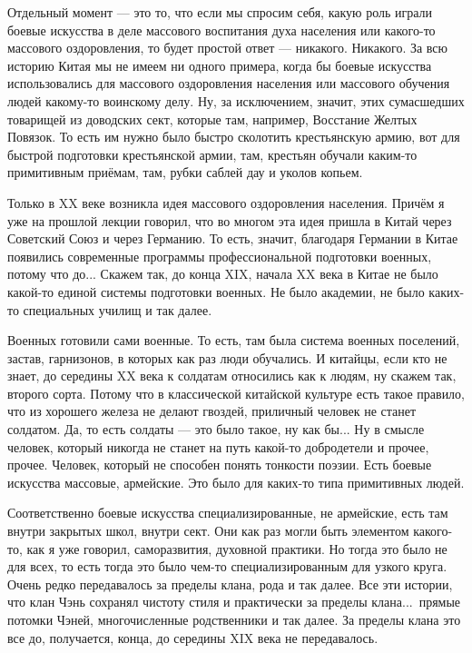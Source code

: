 Отдельный момент 
--- это то,  что если мы спросим себя, какую роль играли боевые 
искусства в деле массового воспитания духа населения 
или какого-то массового оздоровления, то будет 
простой ответ --- никакого. Никакого. За всю историю Китая 
мы не имеем ни одного примера, когда бы боевые 
искусства использовались для массового оздоровления 
населения или массового обучения людей какому-то 
воинскому делу. Ну, за исключением, значит, этих 
сумасшедших товарищей из доводских сект, которые там, 
например, Восстание Желтых Повязок. То есть им нужно 
было быстро сколотить крестьянскую армию, вот для 
быстрой подготовки крестьянской армии, там, крестьян 
обучали каким-то примитивным приёмам, там, рубки 
саблей дау и уколов копьем.
 
Только в XX веке возникла идея 
массового оздоровления населения. Причём я уже на 
прошлой лекции говорил, что во многом эта идея пришла 
в Китай через Советский Союз и через Германию. То есть, 
значит,  благодаря Германии в Китае появились 
современные программы профессиональной подготовки 
военных, потому что до...  Скажем так,  до конца XIX, 
начала XX века в Китае не было какой-то единой системы 
подготовки военных.  Не было академии, не было каких-то 
специальных училищ и так далее.

Военных готовили 
сами военные. То есть, там была система военных 
поселений,  застав, гарнизонов, в которых как раз люди 
обучались. И китайцы, если кто не знает,  до 
середины XX века к солдатам относились как к людям, ну 
скажем так, второго сорта.
Потому что в 
классической китайской культуре есть такое правило, 
что из хорошего железа не делают гвоздей,  приличный 
человек не станет солдатом.  Да, то есть солдаты --- это 
было такое, ну как бы...  Ну в смысле человек, который 
никогда не станет на путь какой-то добродетели и 
прочее, прочее. Человек,  который не способен понять 
тонкости поэзии. Есть боевые искусства массовые, 
армейские.  Это было для каких-то типа примитивных 
людей.

Соответственно боевые искусства 
специализированные,  не армейские, есть там внутри 
закрытых школ, внутри сект. Они как раз могли 
быть элементом какого-то, как я уже говорил, 
саморазвития, духовной практики.  Но тогда это было не 
для всех, то есть тогда это было чем-то 
специализированным для узкого круга. Очень редко 
передавалось за пределы клана, рода и так далее.  Все 
эти истории, что клан Чэнь сохранял чистоту стиля и 
практически за пределы клана...\ прямые потомки Чэней,
многочисленные родственники и так далее. За пределы 
клана это все до, получается,  конца, до середины XIX 
века не передавалось.

